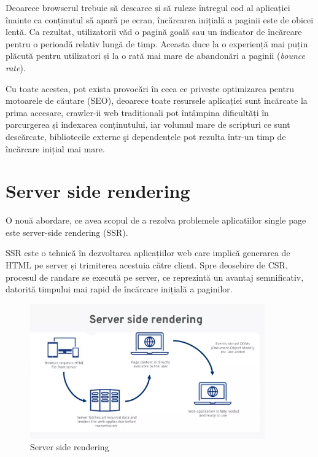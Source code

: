 \documentclass[12pt, a4paper]{report}
\begin{document}
Deoarece browserul trebuie să descarce și să ruleze întregul cod al aplicației înainte ca conținutul să apară pe ecran, încărcarea inițială a paginii este de obicei lentă. Ca rezultat, utilizatorii văd o pagină goală sau un indicator de încărcare pentru o perioadă relativ lungă de timp. Aceasta duce la o experiență mai puțin plăcută pentru utilizatori și la o rată mai mare de abandon\u ari a paginii (\textit{bounce rate}). \cite{google-bouncing-rate}

Cu toate acestea, pot exista provocări în ceea ce privește optimizarea pentru motoarele de căutare (SEO), deoarece toate resursele aplicației sunt \^inc\u arcate la prima accesare, crawler-ii web tradiționali pot întâmpina dificultăți în parcurgerea și indexarea conținutului, iar volumul mare de scripturi ce sunt descărcate, bibliotecile externe \c si dependențele pot rezulta \^intr-un timp de încărcare inițial mai mare.

\section{Server side rendering}

O nou\u a abordare, ce avea scopul de a rezolva problemele aplicatiilor single page este server-side rendering (SSR).

SSR este o tehnică în dezvoltarea aplicațiilor web care implică generarea de HTML pe server și trimiterea acestuia către client. Spre deosebire de CSR, procesul de randare se execut\u a pe server, ce reprezintă un avantaj semnificativ, datorită timpului mai rapid de încărcare inițială a paginilor. \cite{benefitsserverrendering}

\begin{figure}[htbp]
	\centering
	\includegraphics[width=0.9\textwidth]{ssr-diagram.png}
	\caption{Server side rendering}
	\label{fig:ssr-diagram}
\end{figure}
\end{document}
